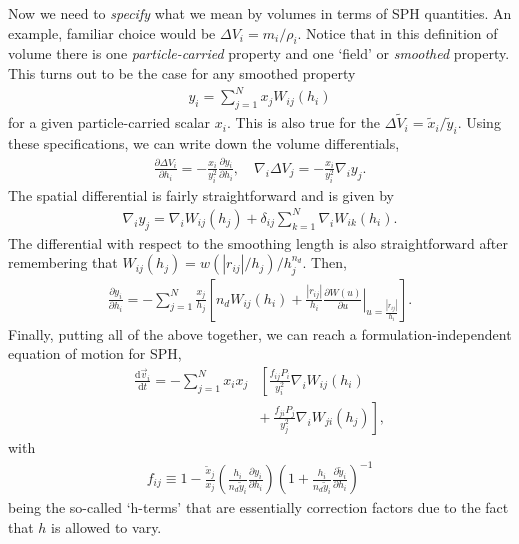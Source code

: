 Now we need to \emph{specify} what we mean by volumes in terms of SPH
quantities. An example, familiar choice would be $\Delta V_i = m_i/\rho_i$.
Notice that in this definition of volume there is one \emph{particle-carried}
property and one `field' or \emph{smoothed} property. This turns out to be the
case for any smoothed property
\begin{align}
  y_i = \sum^N_{j=1} x_j W_{ij}(h_i)
  \label{eqn:sph:derivation:smoothed}
\end{align}
for a given particle-carried scalar $x_i$. This is also true for the $\Delta
\tilde{V}_i = \tilde{x}_i/\tilde{y}_i$. Using these specifications, we can write
down the volume differentials,
\begin{align}
  \frac{\partial \Delta V_i}{\partial h_i} =
    -\frac{x_i}{y_i^2}\frac{\partial y_i}{\partial h_i},
    \quad
  \nabla_i \Delta V_j = -\frac{x_i}{y_i^2} \nabla_i y_j.
  \label{eqn:sph:derivation:volumediffs}
\end{align}
The spatial differential is fairly straightforward and is given by
\begin{align}
  \nabla_i y_j = \nabla_i W_{ij}(h_j)
    + \delta_{ij}\sum_{k=1}^N \nabla_i W_{ik}(h_i).
  \label{eqn:sph:derivation:nablay}
\end{align}
The differential with respect to the smoothing length is also straightforward
after remembering that $W_{ij}(h_j) = w(|r_{ij}|/h_j)/h_j^{n_d}$. Then,
\begin{align}
  \frac{\partial y_i}{\partial h_i} = -\sum_{j=1}^N \frac{x_j}{h_j}
  \left[
    n_d W_{ij}(h_i) + \frac{|r_{ij}|}{h_i}
    \left. 
      \frac{\partial W(u)}{\partial u}
    \right|_{u=\frac{|r_{ij}|}{h_i}}
  \right].
  \label{eqn:sph:derivation:dydh}
\end{align}
Finally, putting all of the above together, we can reach a
formulation-independent equation of motion for SPH,
\begin{align}
  \frac{\mathrm{d}\vec{v}_i}{\mathrm{d}t} = -\sum_{j=1}^N x_i x_j
  & \left[ \frac{f_{ij}P_i}{y_i^2} \nabla_i W_{ij}(h_i) \right. \nonumber \\
  & \left. + ~ \frac{f_{ji} P_j}{y_j^2}\nabla_i W_{ji}(h_j)\right],
  \label{eqn:sph:derivation:spheom}
\end{align}
with
\begin{align}
  f_{ij} \equiv 1 - 
    \frac{\tilde{x}_j}{x_j}
    \left(
      \frac{h_i}{n_d \tilde{y}_i} \frac{\partial y_i}{\partial h_i}
    \right)
    \left(
      1+\frac{h_i}{n_d \tilde{y}_i} \frac{\partial \tilde{y}_i}{\partial h_i}
    \right)^{-1}
  \label{eqn:sph:derivation:fij}
\end{align}
being the so-called `h-terms' that are essentially correction factors due to the
fact that $h$ is allowed to vary.
